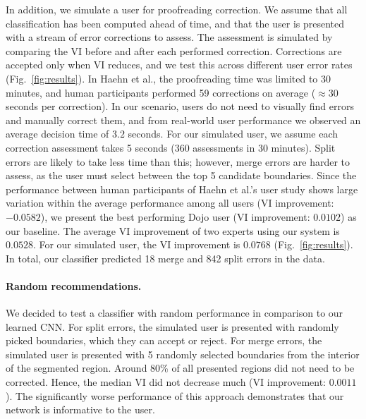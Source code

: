 In addition, we simulate a user for proofreading correction. We assume that all classification has been computed ahead of time, and that the user is presented with a stream of error corrections to assess. The assessment is simulated by comparing the VI before and after each performed correction. Corrections are accepted only when VI reduces, and we test this across different user error rates (Fig.~\ref{fig:results}). In Haehn et al., the proofreading time was limited to 30 minutes, and human participants performed 59 corrections on average ($\approx30$ seconds per correction). In our scenario, users do not need to visually find errors and manually correct them, and from real-world user performance we observed an average decision time of $3.2$ seconds. For our simulated user, we assume each correction assessment takes 5 seconds (360 assessments in 30 minutes). Split errors are likely to take less time than this; however, merge errors are harder to assess, as the user must select between the top 5 candidate boundaries. Since the performance between human participants of Haehn et al.'s user study shows large variation within the average performance among all users (VI improvement: $-0.0582$), we present the best performing Dojo user (VI improvement: $0.0102$) as our baseline. The average VI improvement of two experts using our system is $0.0528$. For our simulated user, the VI improvement is $0.0768$ (Fig.~\ref{fig:results}). In total, our classifier predicted 18 merge and 842 split errors in the data.









\paragraph{Random recommendations.} We decided to test a classifier with random performance in comparison to our learned CNN. For split errors, the simulated user is presented with randomly picked boundaries, which they can accept or reject. For merge errors, the simulated user is presented with 5 randomly selected boundaries from the interior of the segmented region. Around 80\% of all presented regions did not need to be corrected. Hence, the median VI did not decrease much (VI improvement: $0.0011$). The significantly worse performance of this approach demonstrates that our network is informative to the user.

